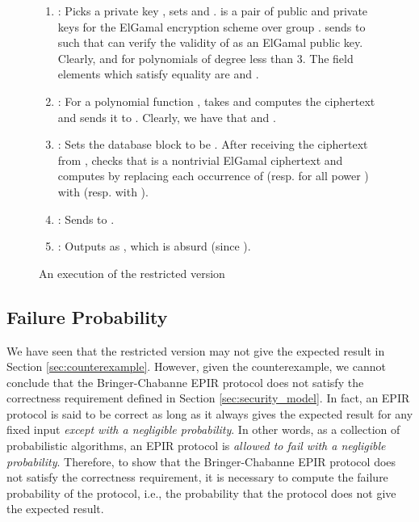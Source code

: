 \documentclass[JMC]{degruyter-journal}
\begin{document}
\begin{figure}[ghp]
\begin{center}
\begin{boxedminipage}{12cm}
\begin{enumerate}
\itemsep=-0.1cm
\item : Picks a private key , sets  and .
 is a pair of public and private keys for  the ElGamal
encryption scheme over group .
  sends  to
 such that  can verify the validity of
 as an ElGamal public key. Clearly,  and
 for polynomials  of degree
less
 than 3.
The field elements  which satisfy  equality 
are  and .
\item  :  For a polynomial function , takes 
and computes the ciphertext  and sends it to .
Clearly,  we have that  and .
\item  : Sets the database block to be .  After receiving the
 ciphertext  from ,  checks that  is a  nontrivial
ElGamal ciphertext and computes  by replacing each occurrence of
 (resp.  for all power ) with 
(resp. with ).
\item  : Sends  to .
\item : Outputs  as , which is absurd (since ).
\end{enumerate}
\end{boxedminipage}
\end{center}
\caption{An execution of the restricted version}
\label{fig:exeRV}
\end{figure}





\subsection{Failure Probability}\label{sec:notations}

We have seen that the restricted version  may not give  the expected
result in Section \ref{sec:counterexample}. However, given the counterexample, we cannot conclude that
the Bringer-Chabanne EPIR protocol does not satisfy the correctness requirement defined in
Section \ref{sec:security_model}.
In fact, an EPIR protocol is said to be correct as long as it always gives  the expected
result for any fixed input  {\em except with a negligible probability}.
In other words, as a collection of probabilistic algorithms,
an EPIR protocol is {\em allowed to fail with a negligible probability}.
Therefore, to show that the Bringer-Chabanne EPIR protocol
does not satisfy the correctness requirement, it is necessary to compute the failure probability
of the protocol, i.e.,
the probability that
the protocol  does not give  the expected result.
\end{document}
